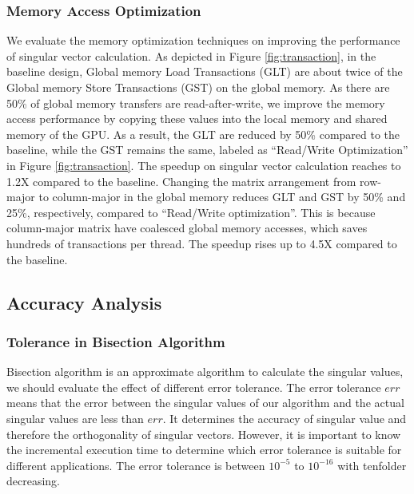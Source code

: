 \subsubsection{Memory Access Optimization}
We evaluate the memory optimization techniques on improving the performance
of singular vector calculation. As depicted in Figure \ref{fig:transaction},
in the baseline design,
Global memory Load Transactions (GLT) are about twice of the Global memory Store Transactions (GST) on the global memory.
As there are 50\% of global memory transfers are read-after-write, we improve the memory access performance by copying these values into the local memory and shared memory of the GPU. As a result, the GLT are reduced by 50\% compared to the baseline, while the GST remains the same, labeled as ``Read/Write Optimization'' in Figure \ref{fig:transaction}. The speedup on singular vector calculation reaches to 1.2X compared to the baseline.
Changing the matrix arrangement from row-major to column-major in the global memory 
reduces GLT and GST by 50\% and 25\%, respectively, compared to ``Read/Write optimization''. 
This is because column-major matrix have coalesced global memory accesses, which saves hundreds of transactions per thread. The speedup rises up to 4.5X compared to the baseline.

\subsection{Accuracy Analysis}
\subsubsection{Tolerance in Bisection Algorithm}
Bisection algorithm is an approximate algorithm to calculate the singular values, we should evaluate the effect of different error tolerance.
The error tolerance $err$ means that the error between the singular values of our algorithm and the actual singular values are less than $err$.
It determines the accuracy of singular value and therefore the orthogonality of singular vectors.
However, it is important to know the incremental execution time to determine which error tolerance is suitable for different applications.
The error tolerance is between $10^{-5}$ to $10^{-16}$ with tenfolder decreasing.

